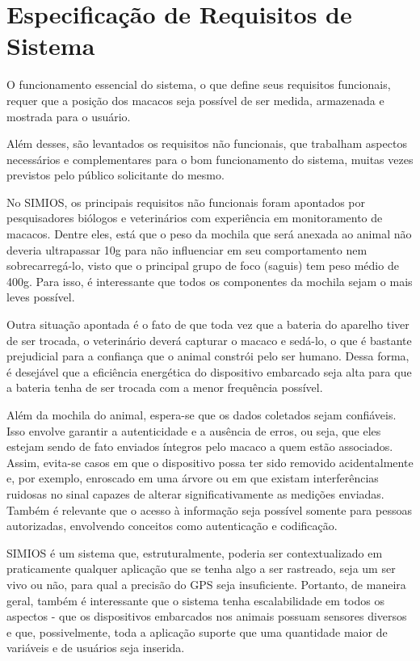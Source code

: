 \chapter{Especificação de Requisitos de Sistema}
O funcionamento essencial do sistema, o que define seus requisitos funcionais, requer que a posição dos macacos seja possível de ser medida, armazenada e mostrada para o usuário.

Além desses, são levantados os requisitos não funcionais, que trabalham aspectos necessários e complementares para o bom funcionamento do sistema, muitas vezes previstos pelo público solicitante do mesmo.

No SIMIOS, os principais requisitos não funcionais foram apontados por pesquisadores biólogos e veterinários com experiência em monitoramento de macacos. Dentre eles, está que o peso da mochila que será anexada ao animal não deveria ultrapassar 10g para não influenciar em seu comportamento nem sobrecarregá-lo, visto que o principal grupo de foco (saguis) tem peso médio de 400g. Para isso, é interessante que todos os componentes da mochila sejam o mais leves possível.

Outra situação apontada é o fato de que toda vez que a bateria do aparelho tiver de ser trocada, o veterinário deverá capturar o macaco e sedá-lo, o que é bastante prejudicial para a confiança que o animal constrói pelo ser humano. Dessa forma, é desejável que a eficiência energética do dispositivo embarcado seja alta para que a bateria tenha de ser trocada com a menor frequência possível.

Além da mochila do animal, espera-se que os dados coletados sejam confiáveis. Isso envolve garantir a autenticidade e a ausência de erros, ou seja, que eles estejam sendo de fato enviados íntegros pelo macaco a quem estão associados. Assim, evita-se casos em que o dispositivo possa ter sido removido acidentalmente e, por exemplo, enroscado em uma árvore ou em que existam interferências ruidosas no sinal capazes de alterar significativamente as medições enviadas. Também é relevante que o acesso à informação seja possível somente para pessoas autorizadas, envolvendo conceitos como autenticação e codificação.

SIMIOS é um sistema que, estruturalmente, poderia ser contextualizado em praticamente qualquer aplicação que se tenha algo a ser rastreado, seja um ser vivo ou não, para qual a precisão do GPS seja insuficiente. Portanto, de maneira geral, também é interessante que o sistema tenha escalabilidade em todos os aspectos - que os dispositivos embarcados nos animais possuam sensores diversos e que, possivelmente, toda a aplicação suporte que uma quantidade maior de variáveis e de usuários seja inserida.

